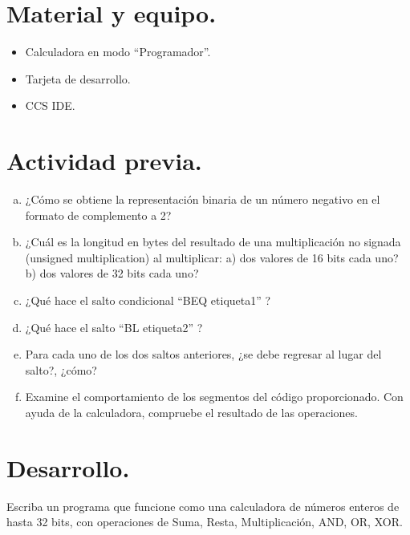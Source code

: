 \documentclass[a4paper,11pt]{article}                 %
\begin{document}
\section{Material y equipo.}
 
\begin{itemize}
	\item Calculadora en modo “Programador”.
	\item Tarjeta de desarrollo.
	\item CCS IDE. 
\end{itemize}
  

  
\section{Actividad previa.}                   

\begin{enumerate}[a)]
	\item ¿Cómo se obtiene la representación binaria de un número negativo en el formato de complemento a 2? 
	
	\item  ¿Cuál es la longitud en bytes del resultado de una multiplicación no signada (unsigned multiplication) al multiplicar: a) dos valores de 16 bits cada uno? b) dos valores de 32 bits cada uno? 
	
	\item  ¿Qué hace el salto condicional “BEQ etiqueta1” ? 
	
	\item  ¿Qué hace el salto “BL etiqueta2” ? 
	
	\item  Para cada uno de los dos saltos anteriores, ¿se debe regresar al lugar del salto?, ¿cómo?
	
	\item Examine el comportamiento de los segmentos del código proporcionado. Con ayuda de la calculadora, compruebe el resultado de las operaciones.
	
\end{enumerate}


 \section{Desarrollo.}

 Escriba un programa que funcione como una calculadora de números enteros de hasta 32 bits, con operaciones de Suma, Resta, Multiplicación, AND, OR, XOR. 
\end{document}
